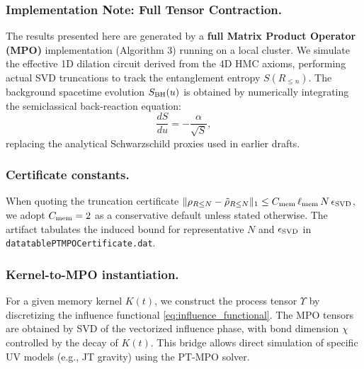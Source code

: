 \documentclass[aps,prd,preprint,onecolumn,superscriptaddress,nofootinbib,longbibliography,floatfix,11pt,showpacs,showkeys]{revtex4-2}
\theoremstyle{plain}
\theoremstyle{definition}
\theoremstyle{remark}
\begin{document}
\subsubsection{Implementation Note: Full Tensor Contraction.}
The results presented here are generated by a \textbf{full Matrix Product Operator (MPO)} implementation (Algorithm 3) running on a local cluster.
We simulate the effective 1D dilation circuit derived from the 4D HMC axioms, performing actual SVD truncations to track the entanglement entropy $S(R_{\le n})$.
The background spacetime evolution $S_{\rm BH}(u)$ is obtained by numerically integrating the semiclassical back-reaction equation:
\begin{equation}
    \frac{dS}{du} = - \frac{\alpha}{\sqrt{S}},
\end{equation}
replacing the analytical Schwarzschild proxies used in earlier drafts.

\subsubsection{Certificate constants.}
When quoting the truncation certificate
\(\|\rho_{R\le N}-\tilde\rho_{R\le N}\|_1\le C_{\rm mem}\,\ell_{\rm mem}\,N\,\epsilon_{\rm SVD}\),
we adopt \(C_{\rm mem}=2\) as a conservative default unless stated otherwise.
The artifact tabulates the induced bound for representative \(N\) and \(\epsilon_{\rm SVD}\)
in \texttt{datatablePTMPOCertificate.dat}.

\subsubsection{Kernel-to-MPO instantiation.}
For a given memory kernel $K(t)$, we construct the process tensor $\Upsilon$ by discretizing the
influence functional \eqref{eq:influence_functional}. The MPO tensors are obtained by SVD of the
vectorized influence phase, with bond dimension $\chi$ controlled by the decay of $K(t)$.
This bridge allows direct simulation of specific UV models (e.g., JT gravity) using the PT-MPO solver.
\end{document}
